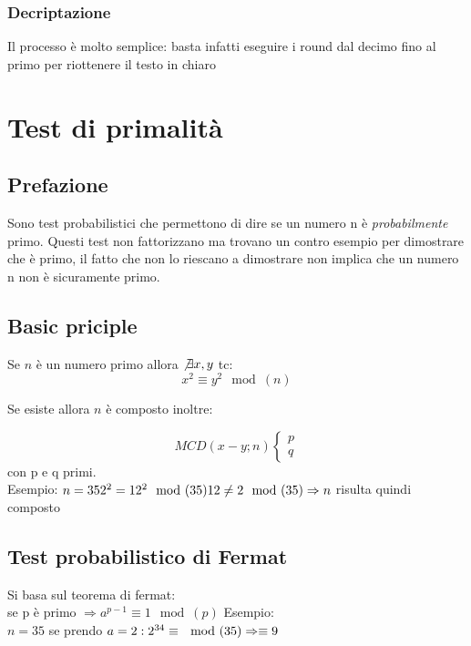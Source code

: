\documentclass[10pt,a4paper]{article}
\begin{document}
\subsubsection{Decriptazione}
Il processo è molto semplice: basta infatti eseguire i round dal decimo fino al primo per riottenere il testo in chiaro

\section{Test di primalità}
\subsection{Prefazione}
Sono test probabilistici che permettono di dire se un numero n è \textit{probabilmente} primo. Questi test non fattorizzano ma trovano un contro esempio per dimostrare che è primo, il fatto che non lo riescano a dimostrare non implica che un numero n non è sicuramente primo.

\subsection{Basic priciple}
Se $n$ è un numero primo allora $\not \exists x,y$ tc:
$$x^2\equiv y^2 \mod(n)$$

Se esiste allora $n$ è composto inoltre:

$$MCD(x-y;n)
\begin{cases}
p\\q
\end{cases}
$$
con p e q primi.\\
Esempio:
$n=35\\
2^2=12^2 \mod(35)\\
12 \not = 2 \mod(35) \Rightarrow n$ risulta quindi composto\\

\subsection{Test probabilistico di Fermat}
Si basa sul teorema di fermat:\\
se p è primo $\Rightarrow a^{p-1}\equiv 1 \mod(p)$
Esempio:\\
$n=35$ se prendo $a=2:\\
2^{34}\equiv \mod(35) \Rightarrow \equiv 9
$
\end{document}
